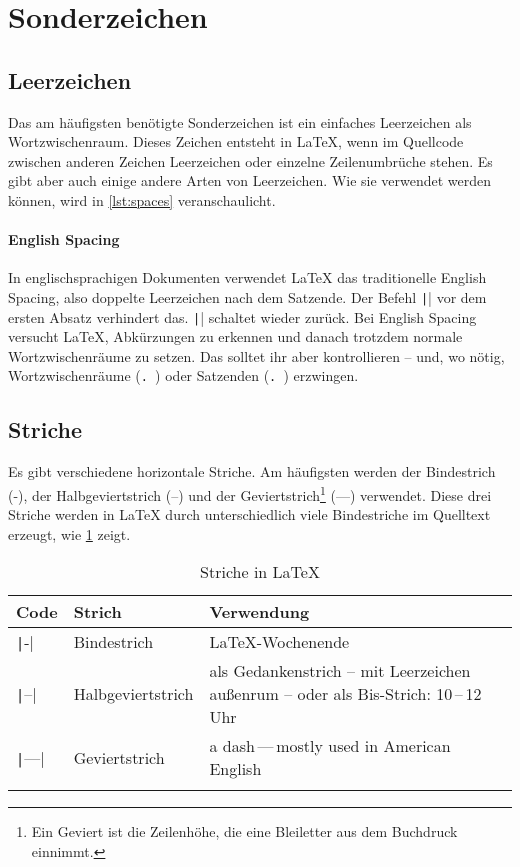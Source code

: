 \section{Sonderzeichen}
\label{sec:special-characters}

\subsection{Leerzeichen}

Das am häufigsten benötigte Sonderzeichen ist ein einfaches Leerzeichen als Wortzwischenraum.
Dieses Zeichen entsteht in \LaTeX, wenn im Quellcode zwischen anderen Zeichen Leerzeichen oder einzelne Zeilenumbrüche stehen.
Es gibt aber auch einige andere Arten von Leerzeichen.
Wie sie verwendet werden können, wird in \cref{lst:spaces} veranschaulicht.


\paragraph{English Spacing}
In englischsprachigen Dokumenten verwendet LaTeX das traditionelle English Spacing, also doppelte Leerzeichen nach dem Satzende.
Der Befehl \texttt|\frenchspacing| vor dem ersten Absatz verhindert das.
\texttt|\nonfrenchspacing| schaltet wieder zurück.
Bei English Spacing versucht \LaTeX, Abkürzungen zu erkennen und danach trotzdem normale Wortzwischenräume zu setzen.
Das solltet ihr aber kontrollieren – und, wo nötig,
Wortzwischenräume (\texttt{.\ }) oder Satzenden (\texttt{\@. }) erzwingen.

\subsection{Striche}
Es gibt verschiedene horizontale Striche.
Am häufigsten werden der Bindestrich (-), der Halbgeviertstrich (–) und der Geviertstrich\footnote{Ein Geviert ist die Zeilenhöhe, die eine Bleiletter aus dem Buchdruck einnimmt.} (—) verwendet.
Diese drei Striche werden in \LaTeX{} durch unterschiedlich viele Bindestriche im Quelltext erzeugt, wie \cref{tbl:bars} zeigt.

\begin{longtable}{@{}llp{7.8cm}@{}}
	\toprule
	Code       & Strich            & Verwendung \\
	\midrule
	\texttt|-|   & Bindestrich       & \LaTeX-Wochenende \\
	\texttt|--|  & Halbgeviertstrich & als Gedankenstrich – mit Leerzeichen außenrum – oder als Bis-Strich: 10\,–\,12 Uhr \\
	\texttt|---| & Geviertstrich     & a dash\,—\,mostly used in American English \\
	\bottomrule
	\caption{Striche in \LaTeX}
	\label{tbl:bars}
\end{longtable}

